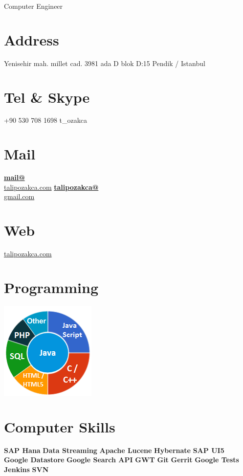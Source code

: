 \documentclass[]{friggeri-cv}
\begin{document}
      {Computer Engineer}
      

\begin{aside}
  \section{Address}
    Yenisehir mah. millet cad. 3981 ada D blok D:15 Pendik / Istanbul
    ~
  \section{Tel \& Skype}
    +90 530 708 1698
    t\_ozakca
    ~
  \section{Mail}
    \href{mailto:mail@talipozakca.com}{\textbf{mail@}\\talipozakca.com}
    \href{mailto:talipozakca@gmail.com}{\textbf{talipozakca@}\\gmail.com}
    ~
  \section{Web}
    \href{http://www.talipozakca.com}{talipozakca.com}
    ~
  \section{Programming}
    \includegraphics[scale=0.62]{img/programming.png}
    ~
    \section{Computer Skills}
    \textbf{SAP Hana}
    \textbf{Data Streaming}
    \textbf{Apache Lucene}
    \textbf{Hybernate}
    \textbf{SAP UI5}
    \textbf{Google Datastore}
    \textbf{Google Search API}
    \textbf{GWT}
    \textbf{Git}
    \textbf{Gerrit}
    \textbf{Google Tests}
    \textbf{Jenkins}
    \textbf{SVN}
    ~
  
\end{aside}
\end{document}
